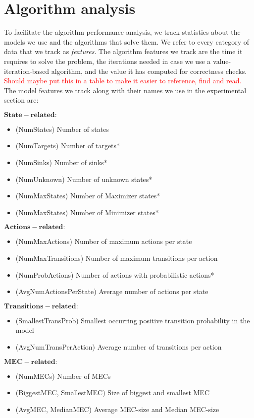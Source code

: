 \chapter{Algorithm analysis} \label{ch:analysis}

To facilitate the algorithm performance analysis, we track statistics about the models we use and the algorithms that solve them. 
We refer to every category of data that we track as \emph{features}.
The algorithm features we track are the time it requires to solve the problem, the iterations needed in case we use a value-iteration-based algorithm, 
and the value it has computed for correctness checks.
\textcolor{red}{Should maybe put this in a table to make it easier to reference, find and read.}
The model features we track along with their names we use in the experimental section are:

$\mathbf{State-related:}$
\begin{itemize}
\item (NumStates) Number of states
\item (NumTargets) Number of targets*
\item (NumSinks) Number of sinks*
\item (NumUnknown) Number of unknown states*
\item (NumMaxStates) Number of Maximizer states*
\item (NumMaxStates) Number of Minimizer states*
\end{itemize}

$\mathbf{Actions-related:}$
\begin{itemize}
\item (NumMaxActions) Number of maximum actions per state
\item (NumMaxTransitions) Number of maximum transitions per action
\item (NumProbActions) Number of actions with probabilistic actions*
\item (AvgNumActionsPerState) Average number of actions per state
\end{itemize}

$\mathbf{Transitions-related:}$
\begin{itemize}
\item (SmallestTransProb) Smallest occurring positive transition probability in the model
\item (AvgNumTransPerAction) Average number of transitions per action
\end{itemize} 

$\mathbf{MEC-related:}$
\begin{itemize}
\item (NumMECs) Number of MECs
\item (BiggestMEC, SmallestMEC) Size of biggest and smallest MEC
\item (AvgMEC, MedianMEC) Average MEC-size and Median MEC-size
\end{itemize}

